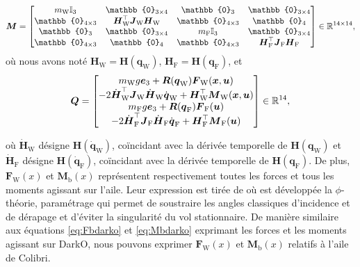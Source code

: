 \begin{align}
    \boldsymbol{M} = \begin{bmatrix}
        m_{\text{W}} \mathbb{I}_{3} & \mathbb{0}_{3 \times 4} & \mathbb{0}_{3} & \mathbb{0}_{3 \times 4}\\
        \mathbb{0}_{4 \times 3} & \boldsymbol{H}_{\text{W}}^\top \boldsymbol{J}_{\text{W}} \boldsymbol{H}_{\text{W}} & \mathbb{0}_{4 \times 3} & \mathbb{0}_{4}\\
        \mathbb{0}_{3} & \mathbb{0}_{3 \times 4} & m_{\text{F}} \mathbb{I}_{3} & \mathbb{0}_{3 \times 4} \\
        \mathbb{0}_{4 \times 3} & \mathbb{0}_{4 } & \mathbb{0}_{4 \times 3} & \boldsymbol{H}_{\text{F}}^\top \boldsymbol{J}_{\text{F}} \boldsymbol{H}_{\text{F}}    \end{bmatrix}\in \real^{14\times14},
\end{align}
où nous avons noté $\boldsymbol{H}_{\text{W}} = \boldsymbol{H}(\boldsymbol{q}_{\text{W}})$, $\boldsymbol{H}_{\text{F}} = \boldsymbol{H}(\boldsymbol{q}_{\text{F}})$, et
\begin{align}
    \label{eq:Q}
    \boldsymbol{Q} = \begin{bmatrix}
            m_{\text{W}} g \boldsymbol{e}_3 + \boldsymbol{R}(\boldsymbol{q}_{\text{W}}) \boldsymbol{F}_{\text{W}}(\boldsymbol{x}, \boldsymbol{u})\\
            -2\dot{\boldsymbol{H}}_{\text{W}}^\top \boldsymbol{J}_{\text{W}} \dot{\boldsymbol{H}}_{\text{W}} \dot{\boldsymbol{q}}_{\text{W}} + \boldsymbol{H}_{\text{W}}^\top \boldsymbol{M}_{\text{W}}(\boldsymbol{x}, \boldsymbol{u})\\
            m_{\text{F}} g \boldsymbol{e}_3 + \boldsymbol{R}(\boldsymbol{q}_{\text{F}}) \boldsymbol{F}_{\text{F}}(\boldsymbol{u})\\
            -2\dot{\boldsymbol{H}}_{\text{F}}^\top \boldsymbol{J}_{\text{F}} \dot{\boldsymbol{H}}_{\text{F}} \dot{\boldsymbol{q}}_{\text{F}} + \boldsymbol{H}_{\text{F}}^\top \boldsymbol{M}_{\text{F}}(\boldsymbol{u})\\
        \end{bmatrix} \in {\mathbb R}^{14},
\end{align}


où $\dot{\boldsymbol{H}}_{\text{W}}$ désigne $\boldsymbol{H}(\dot{\boldsymbol{q}}_{\text{W}})$, coïncidant avec la dérivée temporelle de $\boldsymbol{H}(\boldsymbol{q}_{\text{W}})$ et $\dot{\boldsymbol{H}}_{\text{F}}$ désigne $\boldsymbol{H}(\dot{\boldsymbol{q}}_{\text{F}})$, coïncidant avec la dérivée temporelle de $\boldsymbol{H}(\boldsymbol{q}_{\text{F}})$. De plus, $\boldsymbol{F}_{\text{W}}(x)$ et $\boldsymbol{M}_{\text{b}}(x)$ représentent respectivement toutes les forces et tous les moments agissant sur l'aile. Leur expression est tirée de \cite[équations (45) et (57)]{lustosaHal-03035938} où est développée la $\phi$-théorie, paramétrage qui permet de soustraire les angles classiques d'incidence et de dérapage et d'éviter la singularité du vol stationnaire. De manière similaire aux équations \eqref{eq:Fbdarko} et \eqref{eq:Mbdarko} exprimant les forces et les moments agissant sur DarkO, nous pouvons exprimer $\boldsymbol{F}_{\text{W}}(x)$ et $\boldsymbol{M}_{\text{b}}(x)$ relatifs à l'aile de Colibri.

